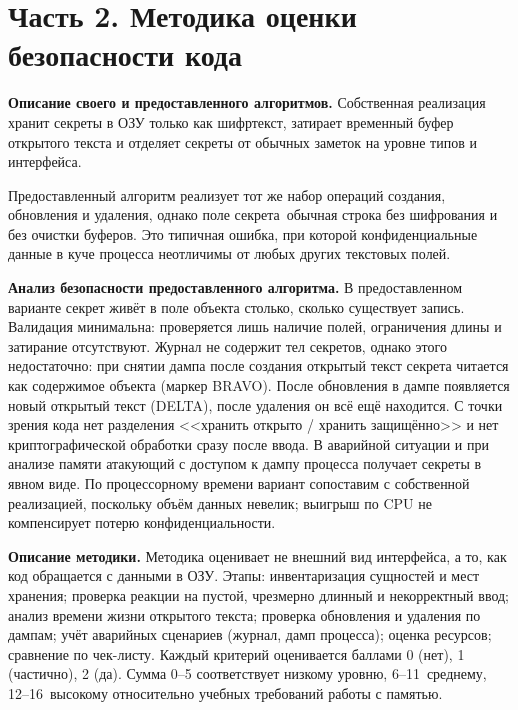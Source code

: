 \section{Часть 2. Методика оценки безопасности кода}
\label{sec:part2}

\textbf{Описание своего и предоставленного алгоритмов.}
Собственная реализация хранит секреты в ОЗУ только как шифртекст, затирает временный буфер открытого текста и отделяет секреты от обычных заметок на уровне типов и интерфейса.

Предоставленный алгоритм реализует тот же набор операций создания, обновления и удаления, однако поле секрета~\mdash  обычная строка без шифрования и без очистки буферов. Это типичная ошибка, при которой конфиденциальные данные в куче процесса неотличимы от любых других текстовых полей.

\textbf{Анализ безопасности предоставленного алгоритма.}
В предоставленном варианте секрет живёт в поле объекта столько, сколько существует запись. Валидация минимальна: проверяется лишь наличие полей, ограничения длины и затирание отсутствуют. Журнал не содержит тел секретов, однако этого недостаточно: при снятии дампа после создания открытый текст секрета читается как содержимое объекта (маркер BRAVO). После обновления в дампе появляется новый открытый текст (DELTA), после удаления он всё ещё находится. С точки зрения кода нет разделения <<хранить открыто / хранить защищённо>> и нет криптографической обработки сразу после ввода. В аварийной ситуации и при анализе памяти атакующий с доступом к дампу процесса получает секреты в явном виде. По процессорному времени вариант сопоставим с собственной реализацией, поскольку объём данных невелик; выигрыш по CPU не компенсирует потерю конфиденциальности.

\textbf{Описание методики.}
Методика оценивает не внешний вид интерфейса, а то, как код обращается с данными в ОЗУ. Этапы: инвентаризация сущностей и мест хранения; проверка реакции на пустой, чрезмерно длинный и некорректный ввод; анализ времени жизни открытого текста; проверка обновления и удаления по дампам; учёт аварийных сценариев (журнал, дамп процесса); оценка ресурсов; сравнение по чек-листу. Каждый критерий оценивается баллами 0 (нет), 1 (частично), 2 (да). Сумма 0--5 соответствует низкому уровню, 6--11~\mdash  среднему, 12--16~\mdash  высокому относительно учебных требований работы с памятью.

